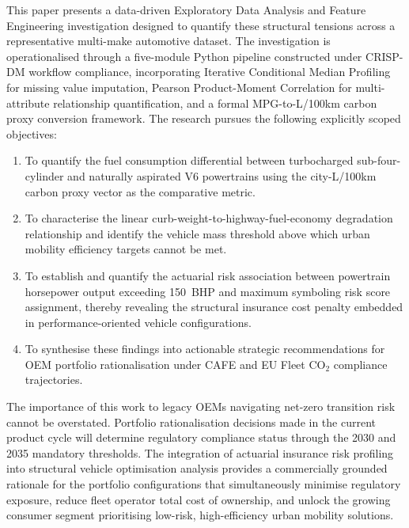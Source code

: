 \documentclass[conference]{IEEEtran}
\begin{document}
This paper presents a data-driven Exploratory Data Analysis and Feature
Engineering investigation designed to quantify these structural tensions
across a representative multi-make automotive dataset. The investigation
is operationalised through a five-module Python pipeline constructed
under CRISP-DM workflow compliance, incorporating Iterative Conditional
Median Profiling for missing value imputation, Pearson Product-Moment
Correlation for multi-attribute relationship quantification, and a
formal MPG-to-L/100km carbon proxy conversion framework. The research
pursues the following explicitly scoped objectives:

\begin{enumerate}
  \item To quantify the fuel consumption differential between turbocharged
    sub-four-cylinder and naturally aspirated V6 powertrains using the
    city-L/100km carbon proxy vector as the comparative metric.
  \item To characterise the linear curb-weight-to-highway-fuel-economy
    degradation relationship and identify the vehicle mass threshold
    above which urban mobility efficiency targets cannot be met.
  \item To establish and quantify the actuarial risk association between
    powertrain horsepower output exceeding 150~BHP and maximum symboling
    risk score assignment, thereby revealing the structural insurance
    cost penalty embedded in performance-oriented vehicle configurations.
  \item To synthesise these findings into actionable strategic recommendations
    for OEM portfolio rationalisation under CAFE and EU Fleet CO$_2$
    compliance trajectories.
\end{enumerate}

The importance of this work to legacy OEMs navigating net-zero transition
risk cannot be overstated. Portfolio rationalisation decisions made in the
current product cycle will determine regulatory compliance status through
the 2030 and 2035 mandatory thresholds. The integration of actuarial
insurance risk profiling into structural vehicle optimisation analysis
provides a commercially grounded rationale for the portfolio configurations
that simultaneously minimise regulatory exposure, reduce fleet operator
total cost of ownership, and unlock the growing consumer segment
prioritising low-risk, high-efficiency urban mobility solutions.

\end{document}
